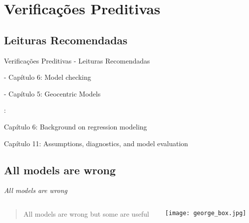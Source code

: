 \section{Verificações Preditivas}

\subsection{Leituras Recomendadas}
\begin{frame}{Verificações Preditivas - Leituras Recomendadas}
    \begin{vfilleditems}
        \item \textcite{gelman2013bayesian} - Capítulo 6: Model checking
        \item \textcite{mcelreath2020statistical} - Capítulo 5: Geocentric Models
        \item \textcite{gelman2020regression}:
        \begin{vfilleditems}
            \item Capítulo 6: Background on regression modeling
            \item Capítulo 11: Assumptions, diagnostics, and model evaluation
        \end{vfilleditems}
        \item \textcite{gelmanBayesianWorkflow2020}
    \end{vfilleditems}
\end{frame}

\subsection{All models are wrong}
\begin{frame}{\textit{All models are wrong}}
    \begin{columns}
        \begin{column}{0.8\textwidth}
            \begin{quotation}
                All models are wrong but some are useful
            \end{quotation}
            \vfill
            \textcite{boxScienceStatistics1976}
        \end{column}
        \begin{column}{0.2\textwidth}
            \texttt{[image: george\_box.jpg]}
        \end{column}
    \end{columns}
\end{frame}

